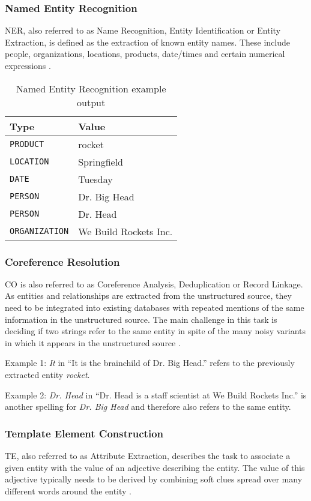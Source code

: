\subsubsection{Named Entity Recognition}
\gls{NER}, also referred to as Name Recognition, Entity Identification or Entity Extraction, is defined as the extraction of known entity names. These include people, organizations, locations, products, date/times and certain numerical expressions \cite{Linsmayr:2010}. 

\begin{table}[H]
\centering
\begin{tabular*}{\textwidth}{ l  l }
	\toprule
	\textbf{Type} & \textbf{Value} \\
	\midrule
	\texttt{PRODUCT} & rocket \\
	\texttt{LOCATION} & Springfield \\
	\texttt{DATE} & Tuesday \\
	\texttt{PERSON} & Dr. Big Head \\
	\texttt{PERSON} & Dr. Head \\
	\texttt{ORGANIZATION} & We Build Rockets Inc. \\
	\bottomrule
\end{tabular*}
\caption{Named Entity Recognition example output}
\end{table}

\subsubsection{Coreference Resolution}
\gls{CO} is also referred to as Coreference Analysis, Deduplication or Record Linkage. As entities and relationships are extracted from the unstructured source, they need to be integrated into existing databases with repeated mentions of the same information in the unstructured source. The main challenge in this task is deciding if two strings refer to the same entity in spite of the many noisy variants in which it appears in the unstructured source \cite{Sarawagi:2008}.

Example 1: \textit{It} in \enquote{It is the brainchild of Dr. Big Head.} refers to the previously extracted entity \textit{rocket}.

Example 2: \textit{Dr. Head} in \enquote{Dr. Head is a staff scientist at We Build Rockets Inc.} is another spelling for \textit{Dr. Big Head} and therefore also refers to the same entity.

\subsubsection{Template Element Construction}
\gls{TE}, also referred to as Attribute Extraction, describes the task to associate a given entity with the value of an adjective describing the entity. The value of this adjective typically needs to be derived by combining soft clues spread over many different words around the entity
 \cite{Sarawagi:2008}.

